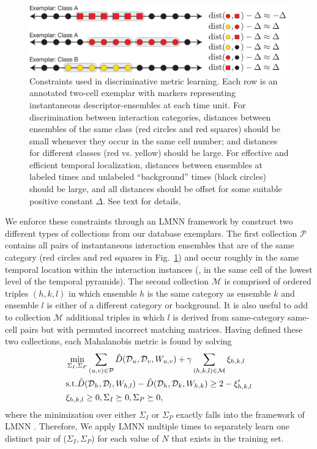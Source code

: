 \begin{figure}[t]
\begin{centering}
\includegraphics[width=\columnwidth]{metriclearning}
\end{centering}
\caption{Constraints used in discriminative metric learning. Each row is an annotated two-cell exemplar with markers representing instantaneous descriptor-ensembles at each time unit. For discrimination between interaction categories, distances between ensembles of the same class (red circles and red squares) should be small whenever they occur in the same cell number; and distances for different classes (red vs. yellow) should be large. For effective and efficient temporal localization, distances between ensembles at labeled times and unlabeled ``background'' times (black circles) should be large, and all distances should be offset for some suitable positive constant $\Delta$. See text for details.}
\label{ML_illustration}
\end{figure}

We enforce these constraints through an LMNN framework by construct two different types of collections from our database exemplars. The first collection $\mathcal{P}$ contains all pairs of instantaneous interaction ensembles that are of the same category (red circles and red squares in Fig.~\ref{ML_illustration}) and occur roughly in the same temporal location within the interaction instances (\ie, in the same cell of the lowest level of the temporal pyramids). The second collection $\mathcal{M}$ is comprised of ordered triples $(h,k,l)$ in which ensemble $h$ is the same category as ensemble $k$ and ensemble $l$ is either of a different category or background. It is also useful to add to collection $\mathcal{M}$ additional triples in which $l$ is derived from same-category same-cell pairs but with permuted incorrect matching matrices. Having defined these two collections, each Mahalanobis metric is found by solving
\begin{equation}
\label{classify}
\begin{split}
&\min_{\Sigma_{I}, \Sigma_{P}} \sum_{(u,v)\in\mathcal{P}}\hat{D}(\mathcal{D}_{u}, \mathcal{D}_{v}, W_{u,v})+\gamma\sum_{(h,k,l)\in\mathcal{M}}\xi_{h,k,l}\\
&\textup{s.t.}  \hat{D}(\mathcal{D}_{h}, \mathcal{D}_{l}, W_{h,l})-\hat{D}(\mathcal{D}_{h}, \mathcal{D}_{k}, W_{h,k})\ge 2-\xi_{h,k,l}'\\
&\xi_{h,k,l}\ge0, \Sigma_{I}\succeq 0, \Sigma_{P}\succeq 0,
\end{split}
\end{equation}
where the minimization over either $\Sigma_{I}$ or $\Sigma_{P}$ exactly falls into the framework of LMNN \cite{Weinberger:ML}. Therefore, We apply LMNN multiple times to separately learn one distinct pair of ($\Sigma_{I}, \Sigma_{P}$) for each value of $N$ that exists in the training set. 



